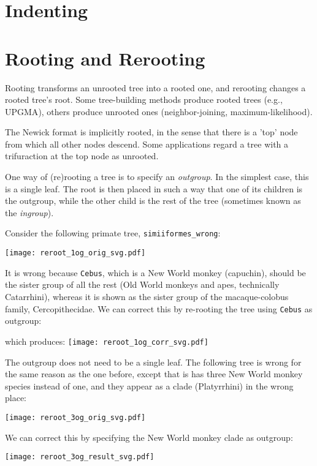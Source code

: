 \documentclass[a4paper,10pt]{report}
\theoremstyle{definition}
\theoremstyle{definition}
\begin{document}
\section{Indenting}
\label{sct_indent}

\section{Rooting and Rerooting}
\label{sct_reroot}

Rooting transforms an unrooted tree into a rooted one, and rerooting changes a rooted tree's root. Some tree-building methods produce rooted trees (e.g., \textsc{UPGMA}), others produce unrooted ones (neighbor-joining, maximum-likelihood). 

The Newick format is implicitly rooted, in the sense that there is a 'top' node from which all other nodes descend. Some applications regard a tree with a trifuraction at the top node as unrooted. 

One way of (re)rooting a tree is to specify an \textit{outgroup}. In the simplest case, this is a single leaf. The root is then placed in such a way that one of its children is the outgroup, while the other child is the rest of the tree (sometimes known as the \textit{ingroup}). 

Consider the following primate tree, \texttt{simiiformes\_wrong}:

\texttt{[image: reroot\_1og\_orig\_svg.pdf]}

\noindent{}It is wrong because \texttt{Cebus}, which is a New World monkey (capuchin), should be the sister group of all the rest (Old World monkeys and apes, technically Catarrhini), whereas it is shown as the sister group of the macaque-colobus family, Cercopithecidae. We can correct this by re-rooting the tree using \texttt{Cebus} as outgroup:

which produces:
\texttt{[image: reroot\_1og\_corr\_svg.pdf]}

The outgroup does not need to be a single leaf. The following tree is wrong for the same reason as the one before, except that is has three New World monkey species instead of one, and they appear as a clade (Platyrrhini) in the wrong place:

\texttt{[image: reroot\_3og\_orig\_svg.pdf]}

\noindent{}We can correct this by specifying the New World monkey clade as outgroup:



\texttt{[image: reroot\_3og\_result\_svg.pdf]}
\end{document}

